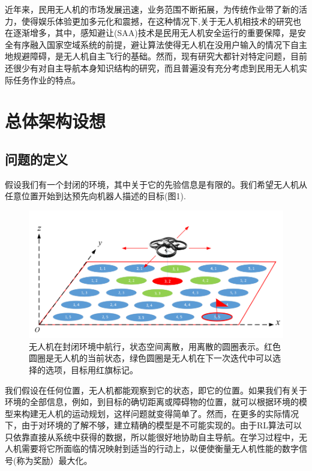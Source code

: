 \documentclass{thuemp}
\begin{document}
近年来，民用无人机的市场发展迅速，业务范围不断拓展，为传统作业带了新的活力，使得娱乐体验更加多元化和震撼，在这种情况下,关于无人机相技术的研究也在逐渐增多，其中，感知避让(SAA)技术是民用无人机安全运行的重要保障，是安全有序融入国家空域系统的前提，避让算法使得无人机在没用户输入的情况下自主地规避障碍，是无人机自主飞行的基础。然而，现有研究大都针对特定问题，目前还很少有对自主导航本身知识结构的研究，而且普遍没有充分考虑到民用无人机实际任务作业的特点。\cite{李竺袁民用无人机自主飞行避让算法研究}


\section{总体架构设想}
\subsection{问题的定义}
假设我们有一个封闭的环境，其中关于它的先验信息是有限的。我们希望无人机从任意位置开始到达预先向机器人描述的目标(图1).
\begin{figure}[H]
\centering
\includegraphics[width=0.8\linewidth]{./image/fig (1).png}
\caption{无人机在封闭环境中航行，状态空间离散，用离散的圆圈表示。红色圆圈是无人机的当前状态，绿色圆圈是无人机在下一次迭代中可以选择的选项，目标用红旗标记。} \label{fig:1}
\end{figure}
我们假设在任何位置，无人机都能观察到它的状态，即它的位置。如果我们有关于环境的全部信息，例如，到目标的确切距离或障碍物的位置，就可以根据环境的模型来构建无人机的运动规划，这样问题就变得简单了。然而，在更多的实际情况下，由于对环境的了解不够，建立精确的模型是不可能实现的。由于RL算法可以只依靠直接从系统中获得的数据，所以能很好地协助自主导航。在学习过程中，无人机需要将它所面临的情况映射到适当的行动上，以便使衡量无人机性能的数字信号(称为奖励）最大化。
\end{document}
